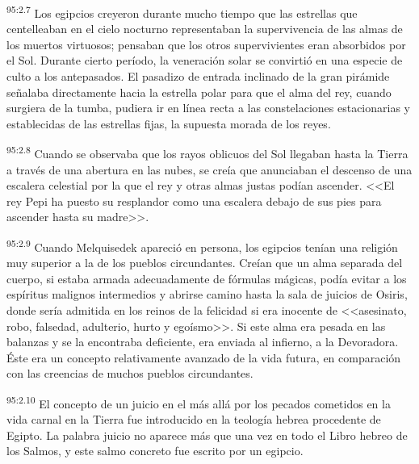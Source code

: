 \par
\textsuperscript{95:2.7} Los egipcios creyeron durante mucho tiempo que las estrellas que centelleaban en el cielo nocturno representaban la supervivencia de las almas de los muertos virtuosos; pensaban que los otros supervivientes eran absorbidos por el Sol. Durante cierto período, la veneración solar se convirtió en una especie de culto a los antepasados. El pasadizo de entrada inclinado de la gran pirámide señalaba directamente hacia la estrella polar para que el alma del rey, cuando surgiera de la tumba, pudiera ir en línea recta a las constelaciones estacionarias y establecidas de las estrellas fijas, la supuesta morada de los reyes.

\par
\textsuperscript{95:2.8} Cuando se observaba que los rayos oblicuos del Sol llegaban hasta la Tierra a través de una abertura en las nubes, se creía que anunciaban el descenso de una escalera celestial por la que el rey y otras almas justas podían ascender. <<El rey Pepi ha puesto su resplandor como una escalera debajo de sus pies para ascender hasta su madre>>.

\par
\textsuperscript{95:2.9} Cuando Melquisedek apareció en persona, los egipcios tenían una religión muy superior a la de los pueblos circundantes. Creían que un alma separada del cuerpo, si estaba armada adecuadamente de fórmulas mágicas, podía evitar a los espíritus malignos intermedios y abrirse camino hasta la sala de juicios de Osiris, donde sería admitida en los reinos de la felicidad si era inocente de <<asesinato, robo, falsedad, adulterio, hurto y egoísmo>>. Si este alma era pesada en las balanzas y se la encontraba deficiente, era enviada al infierno, a la Devoradora. Éste era un concepto relativamente avanzado de la vida futura, en comparación con las creencias de muchos pueblos circundantes.

\par
\textsuperscript{95:2.10} El concepto de un juicio en el más allá por los pecados cometidos en la vida carnal en la Tierra fue introducido en la teología hebrea procedente de Egipto. La palabra juicio no aparece más que una vez en todo el Libro hebreo de los Salmos, y este salmo concreto fue escrito por un egipcio.

